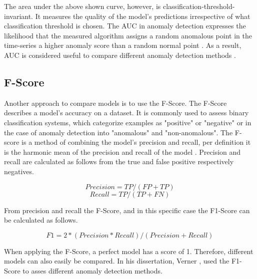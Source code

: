 The area under the above shown curve, however, is classification-threshold-invariant. It measures the quality of the model's predictions irrespective of what classification threshold is chosen. The AUC in anomaly detection expresses the likelihood that the measured algorithm assigns a random anomalous point in the time-series a higher anomaly score than a random normal point \parencite{Google2021}. As a result, AUC is considered useful to compare different anomaly detection methods \parencite{Braei2020} .

\subsection{F-Score} 
Another approach to compare models is to use the F-Score. The F-Score describes a model's accuracy on a dataset. It is commonly used to assess binary classification systems, which categorize examples as "positive" or "negative" or in the case of anomaly detection into "anomalous" and "non-anomalous". The F-score is a method of combining the model's precision and recall, per definition it is the harmonic mean of the precision and recall of the model \parencite{Shung2018}. Precision and recall are calculated as follows from the true and false positive respectively negatives.

\[Precision = TP/(FP+TP)\]
\[Recall = TP/(TP+FN)\]

From precision and recall the F-Score, and in this specific case the F1-Score can be calculated as follows.

\[F1 = 2*(Precision*Recall)/(Precision+Recall)\]

When applying the F-Score, a perfect model has a score of 1. Therefore, different models can also easily be compared. In his dissertation, Verner \parencite*{Verner2019}, used the F1-Score to asses different anomaly detection methods.



